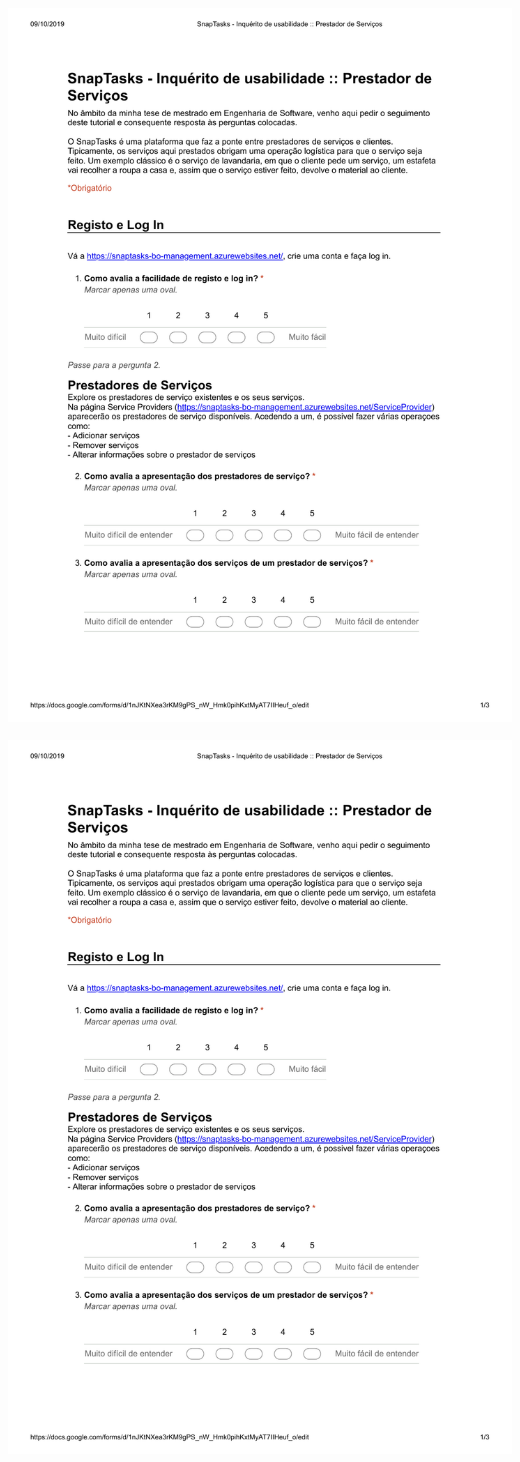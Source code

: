 \includegraphics[page=2,origin=c, width=\textwidth ]{appendices/files/inquiry-serviceprovider.pdf}

\pagebreak

\includegraphics[page=3,origin=c, width=\textwidth ]{appendices/files/inquiry-serviceprovider.pdf}